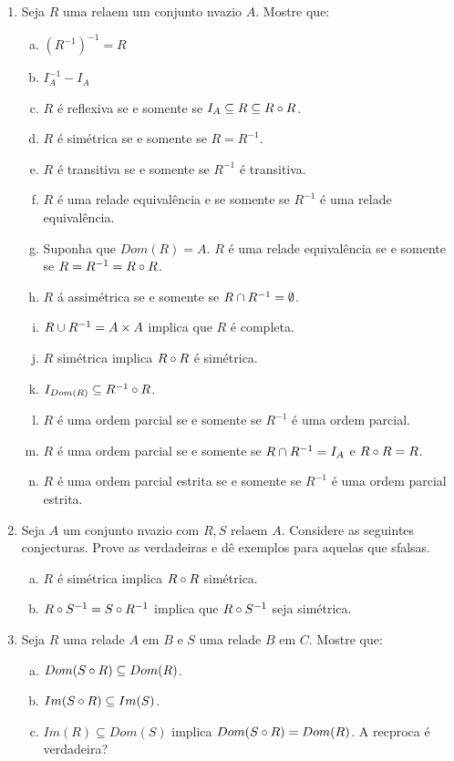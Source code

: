 \begin{enumerate}[{\bf 1.}]
\item Seja $R$ uma rela\cao em um conjunto n\ao vazio $A$. Mostre que:
\begin{enumerate}[a)]
\item $(R^{-1})^{-1}=R$
\item $I_A^{-1}-I_A$
\item $R$ \'e reflexiva se e somente se $I_A\subseteq R\subseteq R\circ R$.
\item $R$ \'e sim\'etrica se e somente se $R=R^{-1}$.
\item $R$ \'e transitiva se e somente se $R^{-1}$ \'e transitiva.
\item $R$ \'e uma rela\cao de equival\^encia e se somente se $R^{-1}$ \'e uma rela\cao de equival\^encia.
\item Suponha que $Dom(R)=A$. $R$ \'e uma rela\cao de equival\^encia se e somente se $R=R^{-1}=R\circ R$.
\item $R$ \'a assim\'etrica se e somente se $R\cap R^{-1}=\emptyset$.
\item $R\cup R^{-1}=A\times A$ implica que $R$ \'e completa.
\item $R$ sim\'etrica implica $R\circ R$ \'e sim\'etrica.
\item $I_{Dom(R)}\subseteq R^{-1}\circ R$.
\item $R$ \'e uma ordem parcial se e somente se $R^{-1}$ \'e uma ordem parcial.
\item $R$ \'e uma ordem parcial se e somente se $R\cap R^{-1}=I_A$ e $R\circ R=R$.
\item $R$ \'e uma ordem parcial estrita se e somente se $R^{-1}$ \'e uma ordem parcial estrita.
\end{enumerate}

\item Seja $A$ um conjunto n\ao vazio com $R,S$ rela\coes em $A$. Considere as seguintes conjecturas. Prove as verdadeiras e d\^e exemplos para aquelas que s\ao falsas.
\begin{enumerate}[a)]
\item $R$ \'e sim\'etrica implica $R\circ R$ sim\'etrica.
\item $R\circ S^{-1}=S\circ R^{-1}$ implica que $R\circ S^{-1}$ seja sim\'etrica.
\end{enumerate}

\item Seja $R$ uma rela\cao de $A$ em $B$ e $S$ uma rela\cao  de $B$ em $C$. Mostre que:
\begin{enumerate}[a)]
\item $Dom(S\circ R)\subseteq Dom(R)$.
\item $Im(S\circ R)\subseteq Im(S)$.
\item $Im(R)\subseteq Dom(S)$ implica $Dom(S\circ R)=Dom(R)$. A rec\ih proca \'e verdadeira? 
\end{enumerate}


\end{enumerate}
